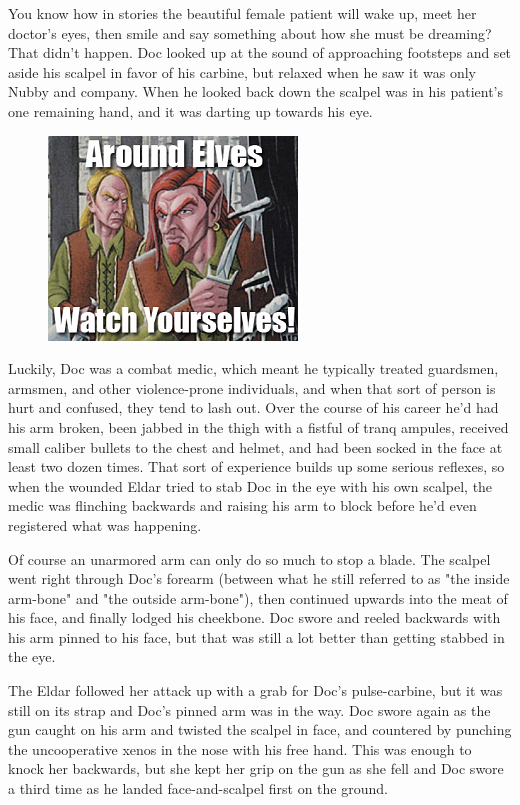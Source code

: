 You know how in stories the beautiful female patient will wake up, meet her doctor's eyes, then smile and say something about how she must be dreaming? 
That didn't happen. 
Doc looked up at the sound of approaching footsteps and set aside his scalpel in favor of his carbine, but relaxed when he saw it was only Nubby and company. 
When he looked back down the scalpel was in his patient's one remaining hand, and it was darting up towards his eye.

\begin{figure}
	\begin{center}
		\includegraphics[width=\figwidth]{pics/16/38.png}
	\end{center}
\end{figure}
Luckily, Doc was a combat medic, which meant he typically treated guardsmen, armsmen, and other violence-prone individuals, and when that sort of person is hurt and confused, they tend to lash out. 
Over the course of his career he'd had his arm broken, been jabbed in the thigh with a fistful of tranq ampules, received small caliber bullets to the chest and helmet, and had been socked in the face at least two dozen times. 
That sort of experience builds up some serious reflexes, so when the wounded Eldar tried to stab Doc in the eye with his own scalpel, the medic was flinching backwards and raising his arm to block before he'd even registered what was happening.

Of course an unarmored arm can only do so much to stop a blade. 
The scalpel went right through Doc's forearm (between what he still referred to as "the inside arm-bone" and "the outside arm-bone"), then continued upwards into the meat of his face, and finally lodged his cheekbone. 
Doc swore and reeled backwards with his arm pinned to his face, but that was still a lot better than getting stabbed in the eye.

The Eldar followed her attack up with a grab for Doc's pulse-carbine, but it was still on its strap and Doc's pinned arm was in the way. 
Doc swore again as the gun caught on his arm and twisted the scalpel in face, and countered by punching the uncooperative xenos in the nose with his free hand. 
This was enough to knock her backwards, but she kept her grip on the gun as she fell and Doc swore a third time as he landed face-and-scalpel first on the ground. 


